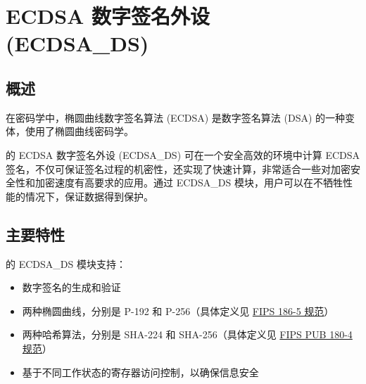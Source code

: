 \documentclass[main\_\_CN.tex]{subfiles}
\begin{document}

\ifglobal
\else
    {\let\clearpage\relax \listoftodos}
    {\let\clearpage\relax \listofdonetodos}
    \tableofcontents
\fi



\hypertarget{ecdsa}{}
\chapter{ECDSA 数字签名外设 (ECDSA\_DS)}
\label{mod:ecdsa}



\section{概述}

在密码学中，椭圆曲线数字签名算法 (ECDSA) 是数字签名算法 (DSA) 的一种变体，使用了椭圆曲线密码学。

\chipname{} 的 ECDSA 数字签名外设 (ECDSA\_DS) 可在一个安全高效的环境中计算 ECDSA 签名，不仅可保证签名过程的机密性，还实现了快速计算，非常适合一些对加密安全性和加密速度有高要求的应用。通过 ECDSA\_DS 模块，用户可以在不牺牲性能的情况下，保证数据得到保护。


\section{主要特性}
\label{sec:ecdsa-features}

\chipname{} 的 ECDSA\_DS 模块支持：

\begin{itemize}
    \item 数字签名的生成和验证
    \item 两种椭圆曲线，分别是 P-192 和 P-256（具体定义见 \href{https://nvlpubs.nist.gov/nistpubs/FIPS/NIST.FIPS.186-5.pdf}{FIPS 186-5 规范}）
    \item 两种哈希算法，分别是 SHA-224 和 SHA-256（具体定义见 \href{https://doi.org/10.6028/NIST.FIPS.180-4}{FIPS PUB 180-4 规范}）
    \item 基于不同工作状态的寄存器访问控制，以确保信息安全
\end{itemize}
\end{document}
